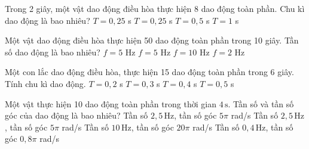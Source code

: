 \begin{ex}
Trong 2 giây, một vật dao động điều hòa thực hiện 8 dao động toàn phần. Chu kì dao động là bao nhiêu?
\choice
{$T = 0{,}25$ s}
{\True $T = 0{,}25$ s}
{$T = 0{,}5$ s}
{$T = 1$ s}
\end{ex}

\begin{ex}
Một vật dao động điều hòa thực hiện 50 dao động toàn phần trong 10 giây. Tần số dao động là bao nhiêu?
\choice
{$f = 5$ Hz}
{\True $f = 5$ Hz}
{$f = 10$ Hz}
{$f = 2$ Hz}
\end{ex}

\begin{ex}
Một con lắc dao động điều hòa, thực hiện 15 dao động toàn phần trong 6 giây. Tính chu kì dao động.
\choice
{$T = 0{,}2$ s}
{$T = 0{,}3$ s}
{\True $T = 0{,}4$ s}
{$T = 0{,}5$ s}
\end{ex}

\begin{ex}
Một vật thực hiện 10 dao động toàn phần trong thời gian $4\,\text{s}$. Tần số và tần số góc của dao động là bao nhiêu?
\choice
{Tần số $2,5\,\text{Hz}$, tần số góc $5\pi$ rad/s}
{\True Tần số $2,5\,\text{Hz}$, tần số góc $5\pi$ rad/s}
{Tần số $10\,\text{Hz}$, tần số góc $20\pi$ rad/s}
{Tần số $0,4\,\text{Hz}$, tần số góc $0,8\pi$ rad/s}
\end{ex}

